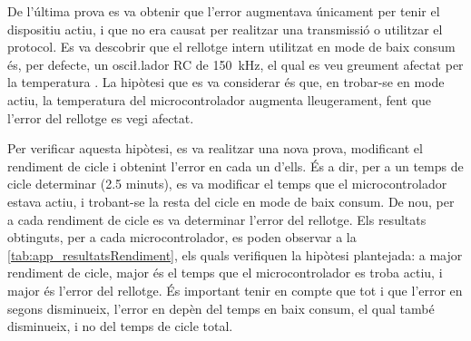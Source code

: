 \documentclass{tfgitic}[2024/07/01]
\begin{document}
{De l'última prova es va obtenir que l'error augmentava únicament per tenir el dispositiu actiu, i que no era causat per realitzar una transmissió o utilitzar el protocol. Es va descobrir que el rellotge intern utilitzat en mode de baix consum és, per defecte, un osci\l.lador RC de \SI{150}{\kilo\hertz}, el qual es veu greument afectat per la temperatura \cite{espressif_system_nodate}. La hipòtesi que es va considerar és que, en trobar-se en mode actiu, la temperatura del microcontrolador augmenta lleugerament, fent que l'error del rellotge es vegi afectat.

Per verificar aquesta hipòtesi, es va realitzar una nova prova, modificant el rendiment de cicle i obtenint l'error en cada un d'ells. És a dir, per a un temps de cicle determinar (2.5 minuts), es va modificar el temps que el microcontrolador estava actiu, i trobant-se la resta del cicle en mode de baix consum. De nou, per a cada rendiment de cicle es va determinar l'error del rellotge. Els resultats obtinguts, per a cada microcontrolador, es poden observar a la \autoref{tab:app_resultatsRendiment}, els quals verifiquen la hipòtesi plantejada: a major rendiment de cicle, major és el temps que el microcontrolador es troba actiu, i major és l'error del rellotge. És important tenir en compte que tot i que l'error en segons disminueix, l'error en  depèn del temps en baix consum, el qual també disminueix, i no del temps de cicle total.

}
\end{document}
